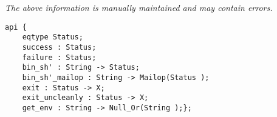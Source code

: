 \label{api:Winix\_Process}

{\tiny \it The above information is manually maintained and may contain errors.}
\begin{verbatim}
api {
    eqtype Status;
    success : Status;
    failure : Status;
    bin_sh' : String -> Status;
    bin_sh'_mailop : String -> Mailop(Status );
    exit : Status -> X;
    exit_uncleanly : Status -> X;
    get_env : String -> Null_Or(String );};
\end{verbatim}

